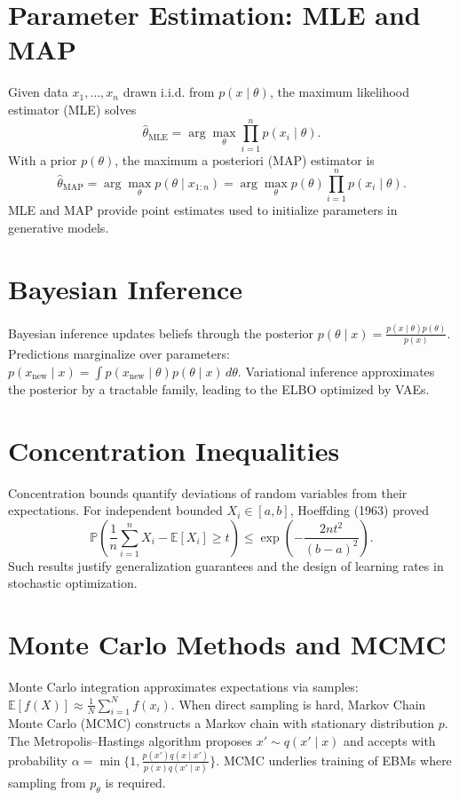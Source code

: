 \section{Parameter Estimation: MLE and MAP}
Given data $x_1,\dots,x_n$ drawn i.i.d. from $p(x\mid\theta)$, the maximum likelihood estimator (MLE) solves
\begin{equation}
\hat{\theta}_{\mathrm{MLE}}=\arg\max_{\theta} \prod_{i=1}^n p(x_i\mid\theta).
\end{equation}
With a prior $p(\theta)$, the maximum a posteriori (MAP) estimator is
\begin{equation}
\hat{\theta}_{\mathrm{MAP}}=\arg\max_{\theta} p(\theta\mid x_{1:n})=\arg\max_{\theta} p(\theta)\prod_{i=1}^n p(x_i\mid\theta).
\end{equation}
MLE and MAP provide point estimates used to initialize parameters in generative models.

\section{Bayesian Inference}
Bayesian inference updates beliefs through the posterior $p(\theta\mid x)=\frac{p(x\mid\theta)p(\theta)}{p(x)}$. Predictions marginalize over parameters: $p(x_{\text{new}}\mid x)=\int p(x_{\text{new}}\mid\theta)p(\theta\mid x)\, d\theta$. Variational inference approximates the posterior by a tractable family, leading to the ELBO optimized by VAEs.

\section{Concentration Inequalities}
Concentration bounds quantify deviations of random variables from their expectations. For independent bounded $X_i\in[a,b]$, Hoeffding (1963) proved
\begin{equation}
\mathbb{P}\left(\frac1n\sum_{i=1}^n X_i-\mathbb{E}[X_i]\ge t\right)\le\exp\left(-\frac{2n t^2}{(b-a)^2}\right).
\end{equation}
Such results justify generalization guarantees and the design of learning rates in stochastic optimization.

\section{Monte Carlo Methods and MCMC}
Monte Carlo integration approximates expectations via samples: $\mathbb{E}[f(X)]\approx\frac1N\sum_{i=1}^N f(x_i)$. When direct sampling is hard, Markov Chain Monte Carlo (MCMC) constructs a Markov chain with stationary distribution $p$. The Metropolis--Hastings algorithm proposes $x'\sim q(x'\mid x)$ and accepts with probability $\alpha=\min\{1, \frac{p(x')q(x\mid x')}{p(x)q(x'\mid x)}\}$. MCMC underlies training of EBMs where sampling from $p_\theta$ is required.

